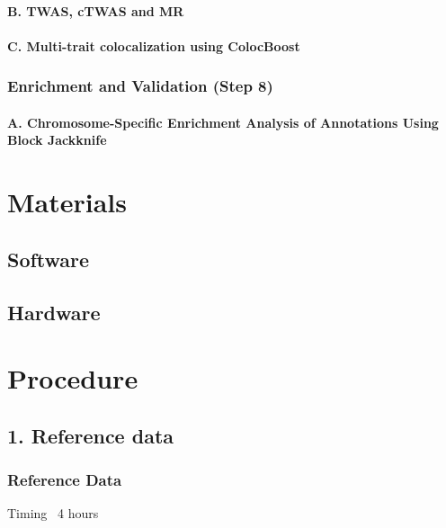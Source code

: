 \documentclass[12pt]{article}
\begin{document}
\paragraph*{B.  TWAS, cTWAS and MR}


\paragraph*{C.  Multi-trait colocalization using ColocBoost}

\subsubsection*{Enrichment and Validation (Step 8)}

\paragraph*{A.  Chromosome-Specific Enrichment Analysis of Annotations Using Block Jackknife}


\section*{Materials}




\subsection*{Software}




\subsection*{Hardware}




\section*{Procedure}





\subsection*{1. Reference data}


\subsubsection*{Reference Data}
Timing ~4 hours
\end{document}
